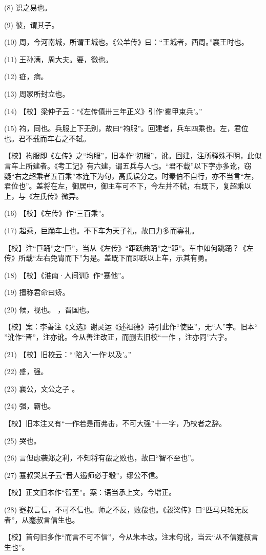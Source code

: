 \documentclass[12pt,UTF8]{ctexbook}
\begin{document}
(8) 识之易也。

(9) 彼，谓其子。

(10) 周，今河南城，所谓王城也。《公羊传》曰：“王城者，西周。”襄王时也。

(11) 王孙满，周大夫。要，徼也。

(12) 疵，病。

(13) 周家所封立也。

(14) 【校】梁仲子云：“《左传僖卅三年正义》引作‘櫜甲束兵’。”

(15) 袀，同也。兵服上下无别，故曰“袀服”。回建者，兵车四乘也。左，君位也。君不载而车右之不轼。

【校】袀服即《左传》之“均服”，旧本作“初服”，讹。回建，注所释殊不明，此似言车上所建者。《考工记》有六建，谓五兵与人也。“君不载”以下字亦多讹，窃疑“右之超乘者五百乘”本连下为句，高氏误分之。时秦伯不自行，亦不当言“左，君位也”。盖将在左，御居中，御主车可不下，今左并不轼，右既下，复超乘以上，与《左氏传》微异。

(16) 【校】《左传》作“三百乘”。

(17) 超乘，巨踊车上也。不下车为天子礼，故曰力多而寡礼。

【校】注“巨踊”之“巨”，当从《左传》“距跃曲踊”之“距”。车中如何跳踊？《左传》所载“左右免胄而下”为是。盖既下而即跃以上车，示其有勇。

(18) 【校】《淮南·人间训》作“蹇他”。

(19) 擅称君命曰矫。

(20) 候，视也。 ，晋国也。

【校】案：李善注《文选》谢灵运《述祖德》诗引此作“使臣”，无“人”字。旧本“ ”讹作“晋”，注亦讹。今从善注改正，而删去旧校“一作 ，注亦同”六字。

(21) 【校】旧校云：“‘陷入’一作‘以及’。”

(22) 盛，强。

(23) 襄公，文公之子 。

(24) 强，霸也。

【校】旧本注又有“一作若是而弗击，不可大强”十一字，乃校者之辞。

(25) 哭也。

(26) 言但虑袭郑之利，不知将有殽之败也，故曰“智不至也”。

(27) 蹇叔哭其子云“晋人遏师必于殽”，缪公不信。

【校】正文旧本作“智至”。案：语当承上文，今增正。

(28) 蹇叔言信，不可不信也。师之不反，败殽也。《穀梁传》曰“匹马只轮无反者”，从蹇叔言信生也。

【校】首句旧多作“而言不可不信”，今从朱本改。注末句讹，当云“从不信蹇叔言生也”。
\end{document}
